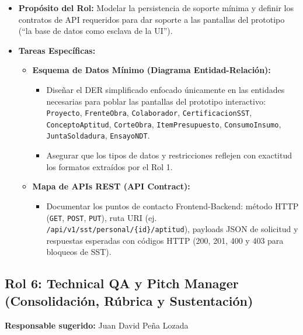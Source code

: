 \documentclass[11pt,letterpaper]{article}
\begin{document}
\begin{itemize}
    \item \textbf{Propósito del Rol:} Modelar la persistencia de soporte mínima y definir los contratos de API requeridos para dar soporte a las pantallas del prototipo (``la base de datos como esclava de la UI'').
    \item \textbf{Tareas Específicas:}
    \begin{itemize}
        \item \textbf{Esquema de Datos Mínimo (Diagrama Entidad-Relación):}
        \begin{itemize}
            \item Diseñar el DER simplificado enfocado únicamente en las entidades necesarias para poblar las pantallas del prototipo interactivo:
            \texttt{Proyecto}, \texttt{FrenteObra}, \texttt{Colaborador}, \texttt{CertificacionSST}, \texttt{ConceptoAptitud}, \texttt{CorteObra}, \texttt{ItemPresupuesto}, \texttt{ConsumoInsumo}, \texttt{JuntaSoldadura}, \texttt{EnsayoNDT}.
            \item Asegurar que los tipos de datos y restricciones reflejen con exactitud los formatos extraídos por el Rol 1.
        \end{itemize}
        \item \textbf{Mapa de APIs REST (API Contract):}
        \begin{itemize}
            \item Documentar los puntos de contacto Frontend-Backend: método HTTP (\texttt{GET}, \texttt{POST}, \texttt{PUT}), ruta URI (ej. \texttt{/api/v1/sst/personal/\{id\}/aptitud}), payloads JSON de solicitud y respuestas esperadas con códigos HTTP (200, 201, 400 y 403 para bloqueos de SST).
        \end{itemize}
    \end{itemize}
\end{itemize}

\subsection{Rol 6: Technical QA y Pitch Manager (Consolidación, Rúbrica y Sustentación)}
\textbf{Responsable sugerido:} Juan David Peña Lozada
\end{document}
